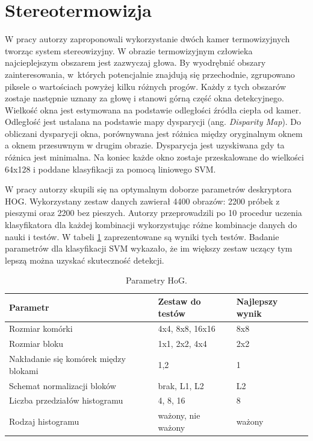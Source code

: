 \section{Stereotermowizja}
W pracy \cite{suard2006pedestrian} autorzy zaproponowali wykorzystanie dwóch kamer termowizyjnych tworząc system stereowizyjny. W obrazie termowizyjnym człowieka najcieplejszym obszarem jest zazwyczaj głowa. By wyodrębnić obszary zainteresowania, w~których potencjalnie znajdują się przechodnie, zgrupowano piksele o wartościach powyżej kilku różnych progów. Każdy z tych obszarów zostaje następnie uznany za głowę i stanowi górną część okna detekcyjnego. Wielkość okna jest estymowana na podstawie odległości źródła ciepła od kamer. Odległość jest ustalana na podstawie mapy dysparycji (ang. \textit{Disparity Map}). Do obliczani dysparycji okna, porównywana jest różnica między oryginalnym oknem a oknem przesuwnym w drugim obrazie. Dysparycja jest uzyskiwana gdy ta różnica jest minimalna. Na koniec każde okno zostaje przeskalowane do wielkości 64x128 i poddane klasyfikacji za pomocą liniowego SVM. %

W pracy autorzy skupili się na optymalnym doborze parametrów deskryptora HOG. Wykorzystany zestaw danych zawierał 4400 obrazów: 2200 próbek z pieszymi oraz 2200 bez pieszych. Autorzy przeprowadzili po 10 procedur uczenia klasyfikatora dla każdej kombinacji wykorzystując różne kombinacje danych do nauki i testów. W tabeli \ref{tab:parametryhog} zaprezentowane są wyniki tych testów. Badanie parametrów dla klasyfikacji SVM wykazało, że im większy zestaw uczący tym lepszą można uzyskać skuteczność detekcji.

\begin{table}[!h]
\centering 
\begin{threeparttable}
\caption{Parametry HoG.}
\label{tab:parametryhog}
\begin{tabularx}{1\textwidth}{|l|X|X|}


\hline Parametr & Zestaw do testów & Najlepszy wynik \\ 
\hline Rozmiar komórki & 4x4, 8x8, 16x16 & 8x8 \\ 
\hline Rozmiar bloku & 1x1, 2x2, 4x4 & 2x2 \\ 
\hline Nakładanie się komórek między blokami & 1,2 & 1 \\ 
\hline Schemat normalizacji bloków & brak, L1, L2 & L2 \\ 
\hline Liczba przedziałów histogramu & 4, 8, 16 & 8 \\ 
\hline Rodzaj histogramu & ważony, nie ważony & ważony \\ 
\hline 


\end{tabularx} 
\end{threeparttable}
\end{table} 

